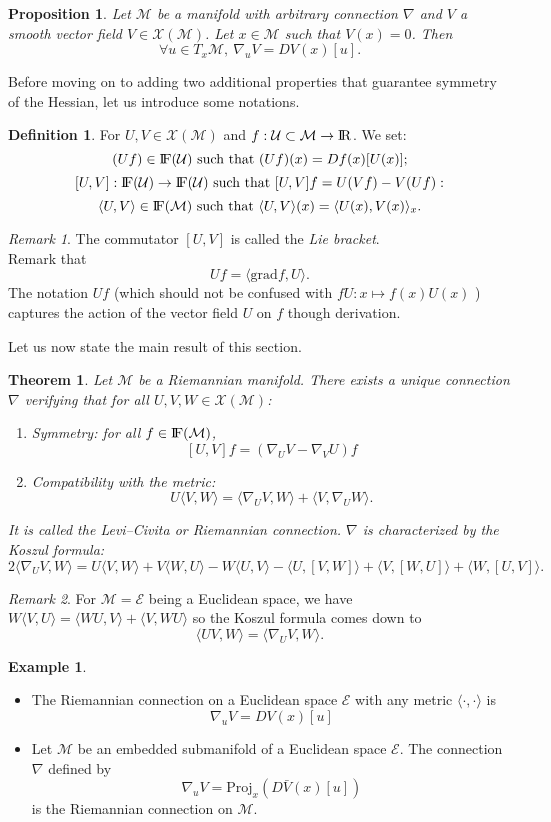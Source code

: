 \documentclass[10pt,a4paper]{book}
\theoremstyle{definition}
\newtheorem{defn}{Definition}[section]
\newtheorem{exm}{Example}[section]
\theoremstyle{plain}
\newtheorem{thm}{Theorem}[section]
\newtheorem{prop}{Proposition}[section]
\theoremstyle{remark}
\newtheorem{rmk}{Remark}[section]
\newcommand{\grad}{\textrm{grad}}
\newcommand{\E}{\mathcal{E}}
\newcommand \M {\mathcal{M}}
\newcommand \X {\mathcal{X}}
\def\R{{\rm I\kern-0.16em R}}
\def\F{{\rm I\kern-0.16em F}}
\begin{document}
\begin{prop}
Let $\M$ be a manifold with arbitrary connection $\nabla$ and $V$ a smooth vector field $V\in \X(\M)$. Let $x\in \M$ such that $V(x)=0$. Then
$$\forall u\in T_x\M,~\nabla_u V=DV(x)[u].$$
\end{prop}
Before moving on to adding two additional properties that guarantee symmetry of the Hessian, let us introduce some notations.
\begin{defn}
For $U,V\in \X(\M)$ and $f:\mathcal{U}\subset \M \to \R$. We set:
$$(Uf) \in \F(\mathcal{U}) \text{ such that } (Uf)(x)=Df(x)[U(x)];$$
$$[U,V]: \F(\mathcal{U})\to \F(\mathcal{U}) \text{ such that } [U,V]f=U(Vf)-V(Uf):$$
$$\langle U,V\rangle \in \F(\M) \text{ such that }\langle U,V \rangle (x)=\langle U(x),V(x)\rangle_x.$$
\end{defn}
\begin{rmk}
The commutator $[U,V]$ is called the \emph{Lie bracket}.\\ Remark that
$$Uf=\langle \grad f,U\rangle.$$
The notation $Uf$ (which should not be confused with $fU:x\mapsto f(x)U(x)$ ) captures the action of the vector field $U$ on $f$ though derivation. 
\end{rmk}
Let us now state the main result of this section.
\begin{thm}
Let $\M$ be a Riemannian manifold. There exists a unique connection $\nabla$ verifying that for all $U,V,W\in \X(\M)$:
\begin{enumerate}
\item \textit{Symmetry:} for all $f\in \F(\M)$,
$$[U,V]f=(\nabla_UV-\nabla_V U)f$$
\item \textit{Compatibility with the metric:}
$$U\langle V,W\rangle = \langle \nabla_U V,W\rangle + \langle V,\nabla_U W\rangle.$$
\end{enumerate}
It is called the \emph{Levi--Civita} or \emph{Riemannian} connection. $\nabla$ is characterized by the \emph{Koszul formula}:
$$2\langle \nabla_U V,W\rangle=U \langle V,W\rangle + V\langle W,U\rangle - W\langle U,V\rangle - \langle U,[V,W]\rangle + \langle V ,[W,U] \rangle+\langle W, [U,V]\rangle.$$
\end{thm}
\begin{rmk}
For $\M=\E$ being a Euclidean space, we have $W\langle V,U\rangle=\langle WU,V\rangle +\langle V,WU\rangle$ so the Koszul formula comes down to
$$\langle UV,W\rangle = \langle \nabla_U V, W\rangle.$$
\end{rmk}
\begin{exm}~ 
\begin{itemize}
\item The Riemannian connection on a Euclidean space $\E$ with any metric $\langle \cdot, \cdot \rangle$ is
$$\nabla_uV=DV(x)[u]$$
\item Let $\M$ be an embedded submanifold of a Euclidean space $\E$. The connection $\nabla$ defined by $$\nabla_u V=\text{Proj}_x(D\bar{V}(x)[u])$$ is the Riemannian connection on $\M$.

\end{itemize}

\end{exm}
\end{document}
